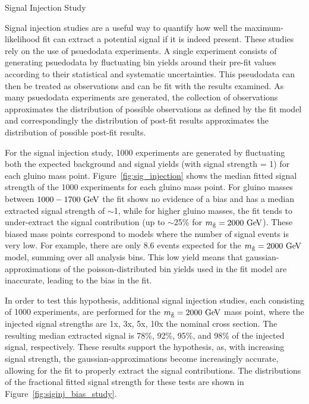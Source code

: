 \begin{subsection}{Signal Injection Study}

Signal injection studies are a useful way to quantify how well the maximum-likelihood fit can extract a potential signal if it is indeed present.
These studies rely on the use of psuedodata experiments.
A single experiment consists of generating psuedodata by fluctuating bin yields around their pre-fit values according to their statistical and systematic uncertainties.
This pseudodata can then be treated as observations and can be fit with the results examined.
As many psuedodata experiments are generated, the collection of observations approximates the distribution of possible observations as defined by the fit model and correspondingly the distribution of post-fit results approximates the distribution of possible post-fit results.

For the signal injection study, 1000 experiments are generated by fluctuating both the expected background and signal yields (with signal strength = 1) for each gluino mass point.
Figure~\ref{fig:sig_injection} shows the median fitted signal strength of the 1000 experiments for each gluino mass point.
For gluino masses between $1000 - 1700~\mathrm{Ge\kern -0.1em V}$ the fit shows no evidence of a bias and has a median extracted signal strength of $\sim$1, while for higher gluino masses, the fit tends to under-extract the signal contribution (up to $\sim$25\% for $m_{\tilde{\mathrm{g}}} = 2000~\mathrm{Ge\kern -0.1em V}$).
These biased mass points correspond to models where the number of signal events is very low.
For example, there are only 8.6 events expected for the $m_{\tilde{\mathrm{g}}} = 2000~\mathrm{Ge\kern -0.1em V}$ model, summing over all analysis bins.
This low yield means that gaussian-approximations of the poisson-distributed bin yields used in the fit model are inaccurate, leading to the bias in the fit.

In order to test this hypothesis, additional signal injection studies, each consisting of 1000 experiments, are performed for the $m_{\tilde{\mathrm{g}}} = 2000~\mathrm{Ge\kern -0.1em V}$ mass point, where the injected signal strengths are 1x, 3x, 5x, 10x the nominal cross section.
The resulting median extracted signal is 78\%, 92\%, 95\%, and 98\% of the injected signal, respectively.
These results support the hypothesis, as, with increasing signal strength, the gaussian-approximations become increasingly accurate, allowing for the fit to properly extract the signal contributions.
The distributions of the fractional fitted signal strength for these tests are shown in Figure~\ref{fig:siginj_bias_study}.


\end{subsection}
